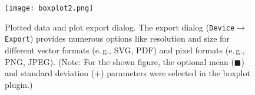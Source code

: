 \begin{figure}[t!]
 \centering
 \texttt{[image: boxplot2.png]}
 \caption{Plotted data and plot export dialog. The export dialog (\texttt{Device$\rightarrow$Export}) provides numerous 
  options like resolution and size for different vector formats (e.\,g., SVG, PDF) and 
  pixel formats (e.\,g., PNG, JPEG). (Note: For the shown figure, the optional  
  mean ($\blacksquare$) and standard deviation ($+$) parameters were selected in the boxplot plugin.)}
 \label{fig:boxplot2}
\end{figure}

\newpage
